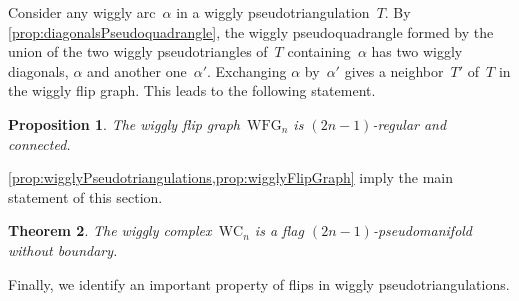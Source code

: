 \documentclass[submission]{FPSAC2025}
\newtheorem{theorem}{Theorem}%
\newtheorem{proposition}[theorem]{Proposition}
\theoremstyle{definition}
\newcommand{\wigglyComplex}{\mathrm{WC}} %
\newcommand{\wigglyFlipGraph}{\mathrm{WFG}} %
\begin{document}
Consider any wiggly arc~$\alpha$ in a wiggly pseudotriangulation~$T$.
By \cref{prop:diagonalsPseudoquadrangle}, the wiggly pseudoquadrangle formed by the union of the two wiggly pseudotriangles of~$T$ containing~$\alpha$ has two wiggly diagonals, $\alpha$ and another one~$\alpha'$.
Exchanging $\alpha$ by~$\alpha'$ gives a neighbor~$T'$ of~$T$ in the wiggly flip graph.
This leads to the following statement.

\begin{proposition}
\label{prop:wigglyFlipGraph}
The wiggly flip graph~$\wigglyFlipGraph_n$ is $(2n-1)$-regular and connected.
\end{proposition}

\cref{prop:wigglyPseudotriangulations,prop:wigglyFlipGraph} imply the main statement of this section.

\begin{theorem}
The wiggly complex~$\wigglyComplex_n$ is a flag $(2n-1)$-pseudomanifold without boundary.
\end{theorem}

Finally, we identify an important property of flips in wiggly pseudotriangulations.
\end{document}
